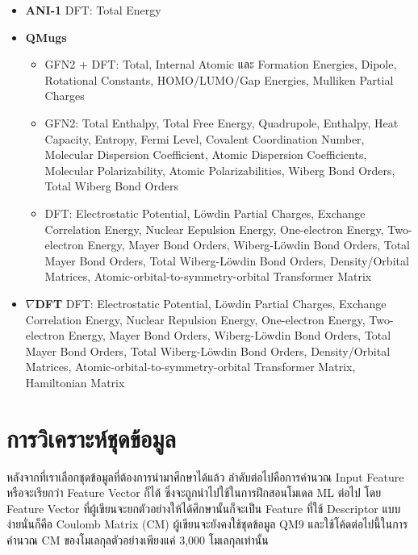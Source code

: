 \begin{itemize}
    \item \textbf{ANI-1}\autocite{smith2017a} DFT: Total Energy
    
    \item \textbf{QMugs}\autocite{mendez2019} 
    \begin{itemize}
        \item GFN2 + DFT: Total, Internal Atomic และ Formation Energies, Dipole, Rotational Constants, 
        HOMO/LUMO/Gap Energies, Mulliken Partial Charges
        
        \item GFN2: Total Enthalpy, Total Free Energy, Quadrupole, Enthalpy, Heat Capacity, Entropy, Fermi 
        Level, Covalent Coordination Number, Molecular Dispersion Coefficient, Atomic Dispersion Coefficients, 
        Molecular Polarizability, Atomic Polarizabilities, Wiberg Bond Orders, Total Wiberg Bond Orders
        
        \item DFT: Electrostatic Potential, L\"{o}wdin Partial Charges, Exchange Correlation Energy, Nuclear 
        Eepulsion Energy, One-electron Energy, Two-electron Energy, Mayer Bond Orders, Wiberg-L\"{o}wdin Bond 
        Orders, Total Mayer Bond Orders, Total Wiberg-L\"{o}wdin Bond Orders, Density/Orbital Matrices, 
        Atomic-orbital-to-symmetry-orbital Transformer Matrix
    \end{itemize}
    
    \item $\nabla$\textbf{DFT}\autocite{khrabrov2022} DFT: Electrostatic Potential, L\"{o}wdin Partial Charges, 
    Exchange Correlation Energy, Nuclear Repulsion Energy, One-electron Energy, Two-electron Energy, Mayer 
    Bond Orders, Wiberg-L\"{o}wdin Bond Orders, Total Mayer Bond Orders, Total Wiberg-L\"{o}wdin Bond Orders, 
    Density/Orbital Matrices, Atomic-orbital-to-symmetry-orbital Transformer Matrix, Hamiltonian Matrix
\end{itemize}
    
\section{การวิเคราะห์ชุดข้อมูล}
\label{sec:dataset_analysis}

หลังจากที่เราเลือกชุดข้อมูลที่ต้องการนำมาศึกษาได้แล้ว ลำดับต่อไปคือการคำนวณ Input Feature หรือจะเรียกว่า Feature Vector ก็ได้
ซึ่งจะถูกนำไปใช้ในการฝึกสอนโมเดล ML ต่อไป โดย Feature Vector ที่ผู้เขียนจะยกตัวอย่างให้ได้ศึกษานั้นก็จะเป็น Feature ที่ใช้ Descriptor 
แบบง่ายนั่นก็คือ Coulomb Matrix (CM) ผู้เขียนจะยังคงใช้ชุดข้อมูล QM9 และใช้โค้ดต่อไปนี้ในการคำนวณ CM ของโมเลกุลตัวอย่างเพียงแค่ 3,000 
โมเลกุลเท่านั้น

